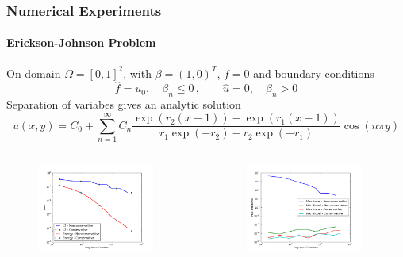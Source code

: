\documentclass[18pt,xcolor=table]{beamer}
\begin{document}
\begin{frame}
\frametitle{Numerical Experiments}
\framesubtitle{Erickson-Johnson Problem}
On domain $\Omega=[0,1]^2$, with $\beta=(1,0)^T$, $f=0$ and boundary
conditions
\[
\hat f=u_0,\quad\beta_n\le0\,,\quad\quad\hat u=0,\quad\beta_n > 0
\]
Separation of variabes gives an analytic solution
\[
u(x,y)=C_0+\sum_{n=1}^\infty C_n
\frac{\exp(r_2(x-1))-\exp(r_1(x-1))}{r_1\exp(-r_2)-r_2\exp(-r_1)}
\cos(n\pi y)
\]
\vspace{-5ex}
\begin{columns}[b]
\begin{column}{0.5\textwidth}
\begin{figure}[t]
\centering
\includegraphics[width=0.9\textwidth]{Erickson/modifiedError.pdf}

\end{figure}
\end{column}
\begin{column}{0.5\textwidth}
\begin{figure}[t]
\centering
\includegraphics[width=0.9\textwidth]{Erickson/modifiedFlux.pdf}

\end{figure}
\end{column}
\end{columns}
\end{frame}

\end{document}
